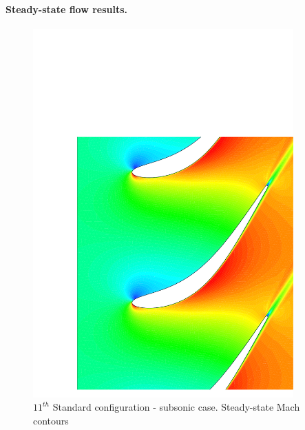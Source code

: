 \paragraph{Steady-state flow results.}
%
%
\begin{figure}
 \centerline{\includegraphics[width=100mm,clip=t]{CHAP_LINEAR/FIGURE/steady_11th_m069_mac_con.pdf}}
 \caption{$11^{th}$ Standard configuration - subsonic case. Steady-state Mach contours}
 \label{conf11_mac_con_069.fig}
\end{figure}
%
%
%
